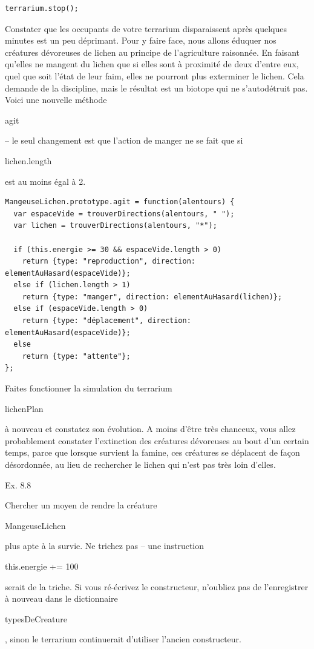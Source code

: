 \documentclass{FramateX}
\renewcommand{\texttt}[1]{\begin{sffamily}{#1}\end{sffamily}}
\begin{document}
\begin{lstlisting}
terrarium.stop();
\end{lstlisting}
\begin{center}\end{center}

Constater que les occupants de votre terrarium disparaissent après
quelques minutes est un peu déprimant. Pour y faire face, nous allons
éduquer nos créatures dévoreuses de lichen au principe de l'agriculture
raisonnée. En faisant qu'elles ne mangent du lichen que si elles sont à
proximité de deux d'entre eux, quel que soit l'état de leur faim, elles
ne pourront plus exterminer le lichen. Cela demande de la discipline,
mais le résultat est un biotope qui ne s'autodétruit pas. Voici une
nouvelle méthode \texttt{agit} -- le seul changement est que l'action de
manger ne se fait que si \texttt{lichen.length} est au moins égal à 2.

\begin{lstlisting}
MangeuseLichen.prototype.agit = function(alentours) {
  var espaceVide = trouverDirections(alentours, " ");
  var lichen = trouverDirections(alentours, "*");

  if (this.energie >= 30 && espaceVide.length > 0)
    return {type: "reproduction", direction: elementAuHasard(espaceVide)};
  else if (lichen.length > 1)
    return {type: "manger", direction: elementAuHasard(lichen)};
  else if (espaceVide.length > 0)
    return {type: "déplacement", direction: elementAuHasard(espaceVide)};
  else
    return {type: "attente"};
};
\end{lstlisting}
Faites fonctionner la simulation du terrarium \texttt{lichenPlan} à
nouveau et constatez son évolution. A moins d'être très chanceux, vous
allez probablement constater l'extinction des créatures dévoreuses au
bout d'un certain temps, parce que lorsque survient la famine, ces
créatures se déplacent de façon désordonnée, au lieu de rechercher le
lichen qui n'est pas très loin d'elles.

\begin{center}\end{center}

Ex. 8.8

Chercher un moyen de rendre la créature \texttt{MangeuseLichen} plus
apte à la survie. Ne trichez pas -- une instruction
\texttt{this.energie += 100} serait de la triche. Si vous ré-écrivez le
constructeur, n'oubliez pas de l'enregistrer à nouveau dans le
dictionnaire \texttt{typesDeCreature}, sinon le terrarium continuerait
d'utiliser l'ancien constructeur.
\end{document}
